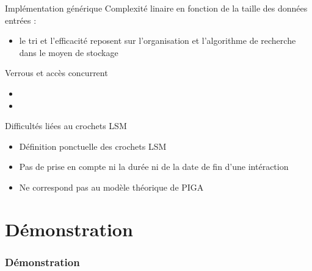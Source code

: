 \documentclass{beamer}
\begin{document}
\begin{frame}{Implémentation générique}
	Complexité linaire en fonction de la taille des données entrées :
	\begin{itemize}
		\item le tri et l'efficacité reposent sur l'organisation et l'algorithme
de recherche dans le moyen de stockage
	\end{itemize}
\end{frame}

\begin{frame}{Verrous et accès concurrent}
	\begin{itemize}
		\item 
		\item 
	\end{itemize}
\end{frame}

\begin{frame}{Difficultés liées au crochets LSM}
	\begin{itemize}
		\item Définition ponctuelle des crochets LSM
		\item Pas de prise en compte ni la durée ni de la date de fin d'une
intéraction
		\item Ne correspond pas au modèle théorique de PIGA
	\end{itemize}
\end{frame}


\section{Démonstration}
\begin{frame}
	\frametitle{Démonstration}
\end{frame}
\end{document}
